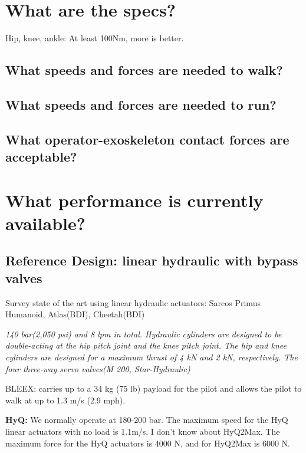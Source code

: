 \documentclass[letterpaper,12pt,fullpage]{article}
\begin{document}




\section{What are the specs?}

Hip, knee, ankle: At least 100Nm, more is better.

\subsection{What speeds and forces are needed to walk?}

\subsection{What speeds and forces are needed to run?}

\subsection{What operator-exoskeleton contact forces are acceptable?}

\section{What performance is currently available?}

\subsection{Reference Design: linear hydraulic with bypass valves}

Survey state of the art using linear hydraulic actuators:
Sarcos Primus Humanoid, Atlas(BDI), Cheetah(BDI)

{\it 140 bar(2,050 psi) and 8 lpm in total. Hydraulic cylinders
are designed to be double-acting at the hip pitch joint and
the knee pitch joint. The hip and knee cylinders are designed
for a maximum thrust of 4 kN and 2 kN, respectively. The
four three-way servo valves(M 200, Star-Hydraulic)}~\cite{IEEE07222598}

BLEEX: carries
up to a 34 kg (75 lb) payload for the pilot and allows the pilot to
walk at up to 1.3 m/s (2.9 mph).

{\bf HyQ:}
We normally operate at 180-200 bar. The maximum speed for the HyQ
linear actuators with no load is 1.1m/s, I don't know about HyQ2Max.
The maximum force for the HyQ actuators is 4000 N, and for HyQ2Max is
6000 N.
\end{document}
